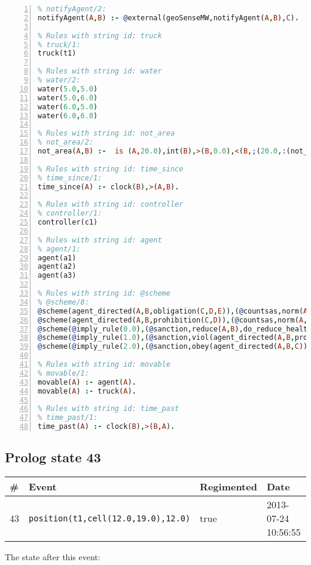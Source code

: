 \documentclass[11pt]{article}\usepackage[utf8]{inputenc}\usepackage{geometry}
\begin{document}
\begin{lstlisting}[language=Prolog, numbers=left]
% Rules with string id: notifyAgent
% notifyAgent/2:
notifyAgent(A,B) :- @external(geoSenseMW,notifyAgent(A,B),C).

% Rules with string id: truck
% truck/1:
truck(t1)

% Rules with string id: water
% water/2:
water(5.0,5.0)
water(5.0,6.0)
water(6.0,5.0)
water(6.0,6.0)

% Rules with string id: not_area
% not_area/2:
not_area(A,B) :-  is (A,20.0),int(B),>(B,0.0),<(B,;(20.0,:(not_area(A,B), is (-(B),20.0)))),int(A),>(A,0.0),<(A,;(20.0,:(area(A,B),-(int(A))))),int(B),>(A,0.0),>(B,0.0),<(A,21.0),<(B,21.0).

% Rules with string id: time_since
% time_since/1:
time_since(A) :- clock(B),>(A,B).

% Rules with string id: controller
% controller/1:
controller(c1)

% Rules with string id: agent
% agent/1:
agent(a1)
agent(a2)
agent(a3)

% Rules with string id: @scheme
% @scheme/8:
@scheme(agent_directed(A,B,obligation(C,D,E)),(@countsas,norm(A,B,F,obligation(C,D,E)),F),false,(listTrue(C)),(time_past(D)),false,[plus(viol(agent_directed(A,B,obligation(C,D,E))))|[]],[plus(obey(agent_directed(A,B,obligation(C,D,E))))|[]])
@scheme(agent_directed(A,B,prohibition(C,D)),(@countsas,norm(A,B,E,prohibition(C,D)),E),(listTrue(C)),false,(false),false,[plus(viol(agent_directed(A,B,prohibition(C,D))))|[]],[plus(obey(agent_directed(A,B,prohibition(C,D))))|[]])
@scheme(@imply_rule(0.0),(@sanction,reduce(A,B),do_reduce_health(A,B),notifyAgent(A,changed(status))),true,false,false,false,[min(reduce(A,B))|[]],[])
@scheme(@imply_rule(1.0),(@sanction,viol(agent_directed(A,B,prohibition(C,D))),do_sanction(D)),true,false,false,false,[min(viol(agent_directed(A,B,prohibition(C,D))))|[]],[])
@scheme(@imply_rule(2.0),(@sanction,obey(agent_directed(A,B,C))),true,false,false,false,[min(obey(agent_directed(A,B,C)))|[]],[])

% Rules with string id: movable
% movable/1:
movable(A) :- agent(A).
movable(A) :- truck(A).

% Rules with string id: time_past
% time_past/1:
time_past(A) :- clock(B),>(B,A).

\end{lstlisting}
\clearpage 
\subsection{Prolog state 43}
\begin{table}[ht]
\centering 
\begin{tabular}{l l l l} 
\textbf{\#} & \textbf{Event} & \textbf{Regimented} & \textbf{Date} \\ [0.5ex] 
\hline
43&\texttt{position(t1,cell(12.0,19.0),12.0)}&true&2013-07-24 10:56:55\\ [1ex] \hline\end{tabular}
\end{table}
The state after this event:
\end{document}
